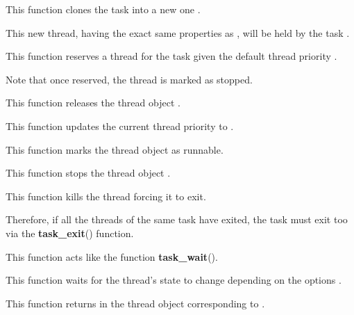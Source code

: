 	 {
	   This function clones the task  into a new one
	   .

	   This new thread, having the exact same properties as ,
	   will be held by the task .
	 }

	 {
	   This function reserves a thread for the task 
	   given the default thread priority .

	   Note that once reserved, the thread is marked as stopped.
	 }

	 {
	   This function releases the thread object .
	 }

	 {
	   This function updates the current thread priority
	   to .
	 }

	 {
	   This function marks the thread object 
	   as runnable.
	 }

	 {
	   This function stops the thread object .
	 }

	 {
	   This function kills the thread  forcing it to
	   exit.

	   Therefore, if all the threads of the same task have exited, the
	   task must exit too via the \textbf{task\_exit}() function.
	 }

	 {
	   This function acts like the function \textbf{task\_wait}().

	   This function waits for the thread's state to change depending on
	   the options .
	 }

	 {
	   This function returns in  the thread object
	   corresponding to .
	 }

